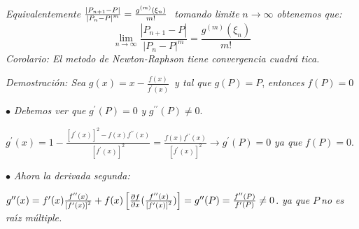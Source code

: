 \documentclass{article}
\begin{document}
\textit{Equivalentemente }$\frac{\left\vert P_{n+1}-P\right\vert }{%
\left\vert P_{n}-P\right\vert ^{m}}=\frac{g^{(m)}(\xi _{n})}{m!}\mathit{\ }$%
\textit{tomando limite }$n\rightarrow \infty $ \textit{obtenemos que: }%
\begin{equation*}
\underset{n\rightarrow \infty }{\lim }\frac{\left\vert P_{n+1}-P\right\vert 
}{\left\vert P_{n}-P\right\vert ^{m}}=\frac{g^{(m)}(\xi _{n})}{m!}
\end{equation*}%
\emph{Corolario: El metodo de Newton-Raphson tiene convergencia cuadr\'{a}%
tica.}

\textit{Demostraci\'{o}n: Sea }$g(x)=x-\frac{f(x)}{f^{\prime }(x)}$\bigskip\ 
\textit{y tal que }$g(P)=P$, \textit{entonces }$f(P)=0$

$\bullet $ \textit{Debemos ver que }$g^{\prime }(P)=0$ \textit{y }$g^{\prime
\prime }(P)\neq 0.$

$g^{\prime }(x)=1-\frac{\left[ f^{\prime }(x)\right] ^{2}-f(x)f^{\prime
\prime }(x)}{\left[ f^{\prime }(x)\right] ^{2}}=\frac{f(x)f^{\prime \prime
}(x)}{\left[ f^{\prime }(x)\right] ^{2}}\rightarrow g^{\prime }(P)=0$ 
\textit{ya que }$f(P)=0$.

$\bullet $ \textit{Ahora la derivada segunda:}

$g^{\prime \prime }(x)=f^{\prime }(x)\frac{f^{\prime \prime }(x)}{\left[
f^{\prime }(x)\right] ^{2}}+f(x)\left[ \frac{\partial f}{\partial x}(\frac{%
f^{\prime \prime }(x)}{\left[ f^{\prime }(x)\right] ^{2}})\right] =g^{\prime
\prime }(P)=\frac{f^{\prime \prime }(P)}{f^{\prime }(P)}\neq 0$. \textit{ya
que }$P\mathit{\ }$\textit{no es ra\'{\i}z m\'{u}ltiple.}
\end{document}
